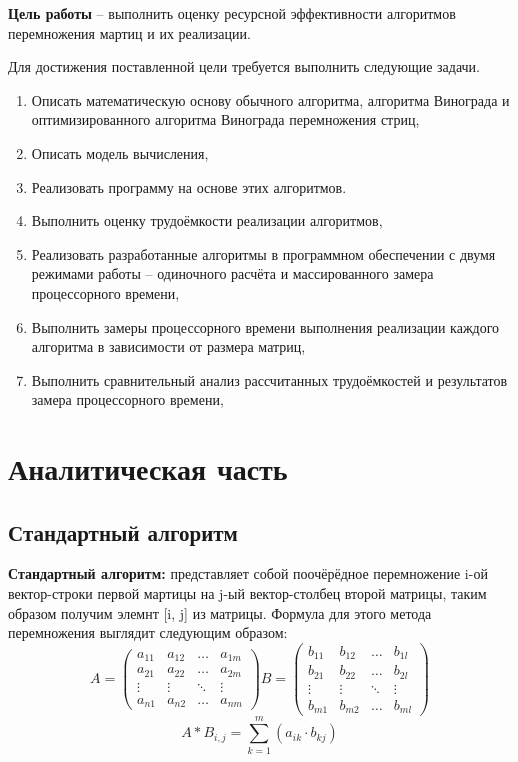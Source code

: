 \documentclass[14pt]{article}
\begin{document}
	\textbf{Цель работы } -- выполнить оценку ресурсной эффективности алгоритмов перемножения мартиц и их реализации.\par
	Для достижения поставленной цели требуется выполнить следующие задачи.
	\begin{enumerate}
		\item Описать математическую основу обычного алгоритма, алгоритма Винограда и оптимизированного алгоритма Винограда перемножения стриц,
		\item Описать модель вычисления,
		\item Реализовать программу на основе этих алгоритмов.
		\item Выполнить оценку трудоёмкости реализации алгоритмов,
		\item Реализовать разработанные алгоритмы в программном обеспечении с двумя режимами работы -- одиночного расчёта и массированного замера процессорного времени,
		\item Выполнить замеры процессорного времени выполнения реализации каждого алгоритма в зависимости от размера матриц,
		\item Выполнить сравнительный анализ рассчитанных трудоёмкостей и результатов замера процессорного времени,
	\end{enumerate}
	
	\newpage
	\section{Аналитическая часть}
	
	\subsection{Стандартный алгоритм}
	\textbf{Стандартный алгоритм:} представляет собой поочёрёдное перемножение i-ой вектор-строки первой мартицы на j-ый вектор-столбец второй матрицы, таким образом получим элемнт [i, j] из матрицы. Формула для этого метода перемножения выглядит следующим образом:
	\begin{equation*}
		A = \left(
		\begin{array}{cccc}
			a_{11} & a_{12} & \ldots & a_{1m}\\
			a_{21} & a_{22} & \ldots & a_{2m}\\
			\vdots & \vdots & \ddots & \vdots\\
			a_{n1} & a_{n2} & \ldots & a_{nm}
		\end{array}
		\right)
		B = \left(
		\begin{array}{cccc}
			b_{11} & b_{12} & \ldots & b_{1l}\\
			b_{21} & b_{22} & \ldots & b_{2l}\\
			\vdots & \vdots & \ddots & \vdots\\
			b_{m1} & b_{m2} & \ldots & b_{ml}
		\end{array}
		\right)
	\end{equation*}
	\begin{equation}
		A*B_{i,j} = \sum_{k=1}^m (a_{ik} \cdot b_{kj})
	\end{equation}
	
\end{document}
